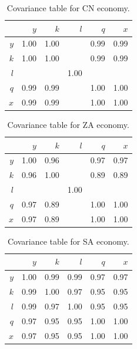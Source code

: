 \documentclass[preprint,authoryear,12pt]{elsarticle}\usepackage{graphicx, color}
\begin{document}
\begin{table}[H]
\begin{center}
\caption{Covariance table for  CN economy.}
\label{tab:Covar_CN}
\begin{tabular}{rrrrrr}
  \hline
 & $y$ & $k$ & $l$ & $q$ & $x$ \\ 
  \hline
$y$ & 1.00 & 1.00 &  & 0.99 & 0.99 \\ 
  $k$ & 1.00 & 1.00 &  & 0.99 & 0.99 \\ 
  $l$ &  &  & 1.00 &  &  \\ 
  $q$ & 0.99 & 0.99 &  & 1.00 & 1.00 \\ 
  $x$ & 0.99 & 0.99 &  & 1.00 & 1.00 \\ 
   \hline
\end{tabular}
\end{center}
\end{table}



\begin{table}[H]
\begin{center}
\caption{Covariance table for  ZA economy.}
\label{tab:Covar_ZA}
\begin{tabular}{rrrrrr}
  \hline
 & $y$ & $k$ & $l$ & $q$ & $x$ \\ 
  \hline
$y$ & 1.00 & 0.96 &  & 0.97 & 0.97 \\ 
  $k$ & 0.96 & 1.00 &  & 0.89 & 0.89 \\ 
  $l$ &  &  & 1.00 &  &  \\ 
  $q$ & 0.97 & 0.89 &  & 1.00 & 1.00 \\ 
  $x$ & 0.97 & 0.89 &  & 1.00 & 1.00 \\ 
   \hline
\end{tabular}
\end{center}
\end{table}



\begin{table}[H]
\begin{center}
\caption{Covariance table for  SA economy.}
\label{tab:Covar_SA}
\begin{tabular}{rrrrrr}
  \hline
 & $y$ & $k$ & $l$ & $q$ & $x$ \\ 
  \hline
$y$ & 1.00 & 0.99 & 0.99 & 0.97 & 0.97 \\ 
  $k$ & 0.99 & 1.00 & 0.97 & 0.95 & 0.95 \\ 
  $l$ & 0.99 & 0.97 & 1.00 & 0.95 & 0.95 \\ 
  $q$ & 0.97 & 0.95 & 0.95 & 1.00 & 1.00 \\ 
  $x$ & 0.97 & 0.95 & 0.95 & 1.00 & 1.00 \\ 
   \hline
\end{tabular}
\end{center}
\end{table}
\end{document}
